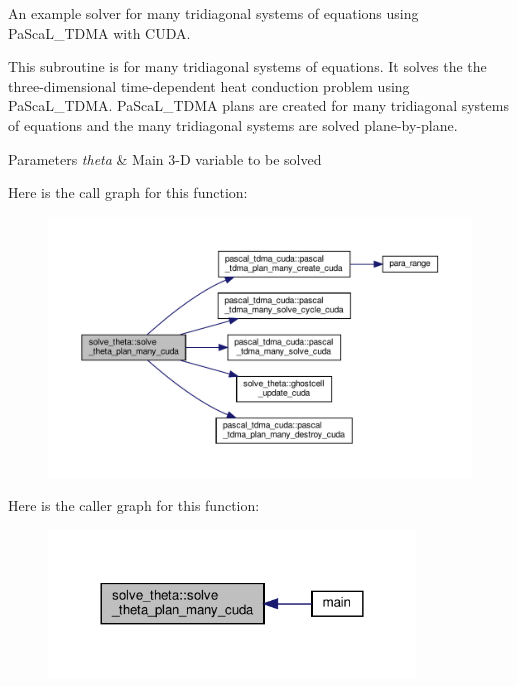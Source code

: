 An example solver for many tridiagonal systems of equations using Pa\+Sca\+L\+\_\+\+T\+D\+MA with C\+U\+DA. 

This subroutine is for many tridiagonal systems of equations. It solves the the three-\/dimensional time-\/dependent heat conduction problem using Pa\+Sca\+L\+\_\+\+T\+D\+MA. Pa\+Sca\+L\+\_\+\+T\+D\+MA plans are created for many tridiagonal systems of equations and the many tridiagonal systems are solved plane-\/by-\/plane. 
\begin{DoxyParams}{Parameters}
{\em theta} & Main 3-\/D variable to be solved \\
\hline
\end{DoxyParams}
Here is the call graph for this function\+:
\nopagebreak
\begin{figure}[H]
\begin{center}
\leavevmode
\includegraphics[width=350pt]{namespacesolve__theta_a84c4bdc671112259790470f6ad4c7e4c_cgraph}
\end{center}
\end{figure}
Here is the caller graph for this function\+:
\nopagebreak
\begin{figure}[H]
\begin{center}
\leavevmode
\includegraphics[width=276pt]{namespacesolve__theta_a84c4bdc671112259790470f6ad4c7e4c_icgraph}
\end{center}
\end{figure}
\mbox{\label{namespacesolve__theta_a215d44e312ec3ab2a3ab44fa0613b100}} 
